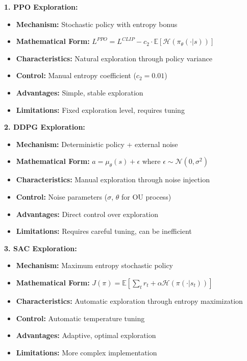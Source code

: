 \documentclass[12pt]{article}
\begin{document}
{{{\textbf{1. PPO Exploration:}
\begin{itemize}
    \item \textbf{Mechanism:} Stochastic policy with entropy bonus
    \item \textbf{Mathematical Form:} $L^{PPO} = L^{CLIP} - c_2 \cdot \mathbb{E}[\mathcal{H}(\pi_\theta(\cdot|s))]$
    \item \textbf{Characteristics:} Natural exploration through policy variance
    \item \textbf{Control:} Manual entropy coefficient ($c_2 = 0.01$)
    \item \textbf{Advantages:} Simple, stable exploration
    \item \textbf{Limitations:} Fixed exploration level, requires tuning
\end{itemize}

\textbf{2. DDPG Exploration:}
\begin{itemize}
    \item \textbf{Mechanism:} Deterministic policy + external noise
    \item \textbf{Mathematical Form:} $a = \mu_\theta(s) + \epsilon$ where $\epsilon \sim \mathcal{N}(0, \sigma^2)$
    \item \textbf{Characteristics:} Manual exploration through noise injection
    \item \textbf{Control:} Noise parameters ($\sigma$, $\theta$ for OU process)
    \item \textbf{Advantages:} Direct control over exploration
    \item \textbf{Limitations:} Requires careful tuning, can be inefficient
\end{itemize}

\textbf{3. SAC Exploration:}
\begin{itemize}
    \item \textbf{Mechanism:} Maximum entropy stochastic policy
    \item \textbf{Mathematical Form:} $J(\pi) = \mathbb{E}[\sum_t r_t + \alpha \mathcal{H}(\pi(\cdot|s_t))]$
    \item \textbf{Characteristics:} Automatic exploration through entropy maximization
    \item \textbf{Control:} Automatic temperature tuning
    \item \textbf{Advantages:} Adaptive, optimal exploration
    \item \textbf{Limitations:} More complex implementation
\end{itemize}

}}}
\end{document}
